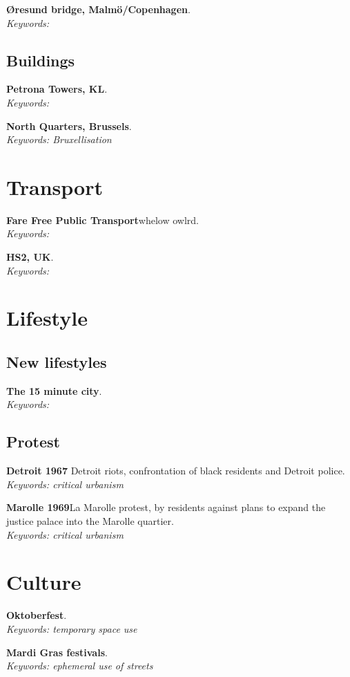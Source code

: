 \documentclass{article}
\newcommand{\entry}[3]{\textbf{#1}\quad #2. \\\textit{Keywords: #3}}
\begin{document}
\entry{Øresund bridge, Malmö/Copenhagen}{}{}

\subsection{Buildings}

\entry{Petrona Towers, KL}{}{}


\entry{North Quarters, Brussels}{}{Bruxellisation}

\section{Transport}

\entry{Fare Free Public Transport}{whelow owlrd}{}

\entry{HS2, UK}{}{}

\section{Lifestyle}

\subsection{New lifestyles}

\entry{The 15 minute city}{}{}

\subsection{Protest}

\entry{Detroit 1967}{ Detroit riots, confrontation of black residents and Detroit police}{critical urbanism}

\entry{Marolle 1969}{La Marolle protest, by residents against plans to expand the justice palace into the Marolle quartier}{critical urbanism}



\section{Culture}

\entry{Oktoberfest}{}{temporary space use}

\entry{Mardi Gras festivals}{}{ephemeral use of streets}

\end{document}
